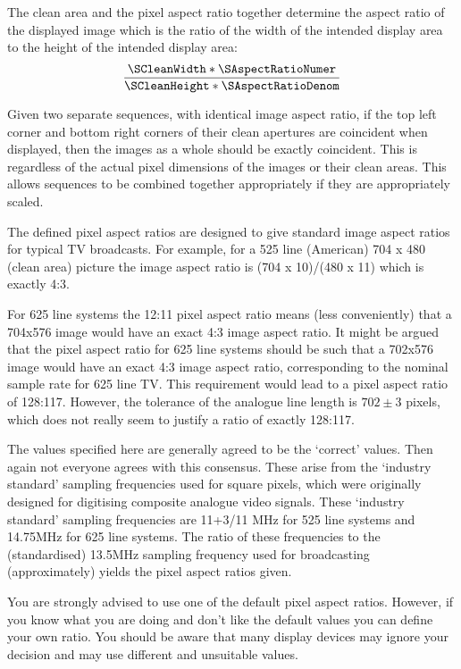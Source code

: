 \begin{informative*}
The clean area and the pixel aspect ratio together determine the
aspect ratio of the displayed image which is the ratio of the width of the intended
display area to the height of the intended display area:
\[\dfrac{\SCleanWidth*\SAspectRatioNumer}{\SCleanHeight*\SAspectRatioDenom}\]

Given two separate sequences, with identical image aspect ratio, if the
top left corner and bottom right corners of their clean apertures are
coincident when displayed, then the images as a whole should be exactly
coincident. This is regardless of the actual pixel dimensions of the
images or their clean areas. This allows sequences to be combined
together appropriately if they are appropriately scaled.

The defined pixel aspect ratios are designed to give standard image
aspect ratios for typical TV broadcasts. For example, for a 525 line
(American) 704 x 480 (clean area)  picture the image aspect ratio is
(704 x 10)/(480 x 11) which is exactly 4:3.

For 625 line systems the 12:11 pixel aspect ratio means (less
conveniently) that a 704x576 image would have an exact 4:3 image
aspect ratio. It might be argued that the pixel aspect ratio for 625
line systems should be such that a 702x576 image would have an exact 4:3
image aspect ratio, corresponding to the nominal sample rate for 625 line TV.
This requirement would lead to a
pixel aspect ratio of 128:117. However, the tolerance of the analogue
line length is $702\pm 3$ pixels, which does not really seem to justify a
ratio of exactly 128:117.

The values specified here are generally agreed to be the
`correct' values. Then again not everyone agrees with this
consensus. These arise from the `industry standard' sampling
frequencies used for square pixels, which were originally designed for
digitising composite analogue video signals. These `industry
standard' sampling frequencies are 11+3/11 MHz for 525 line systems
and 14.75MHz for 625 line systems. The ratio of these frequencies to the
(standardised) 13.5MHz sampling frequency used for broadcasting (approximately) 
yields the pixel aspect ratios given.

You are strongly advised to use one of the default pixel aspect ratios.
However, if you know what you are doing and don't like the default
values you can define your own ratio. You should be aware that many
display devices may ignore your decision and may use different and
unsuitable values. 

\end{informative*}

